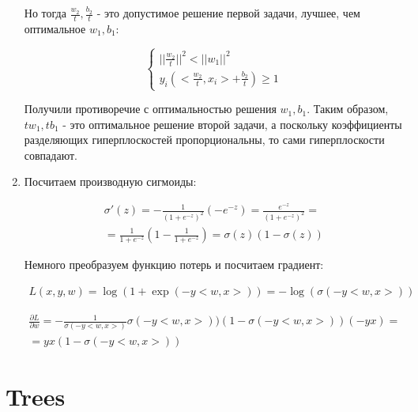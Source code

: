 \documentclass{article}
\begin{document}
\begin{enumerate}
    Но тогда $ \frac{w_2}{t}, \frac{b_2}{t} $ - это допустимое решение первой задачи, лучшее, чем оптимальное $ w_1, b_1 $:

    \small
    \begin{equation*}
        \begin{cases}
            {|| \frac{w_2}{t} ||}^2 < {|| w_1 ||}^2 \\
            y_i (<\frac{w_2}{t}, x_i> + \frac{b_2}{t}) \ge 1
        \end{cases}
    \end{equation*}
    \normalsize

    Получили противоречие с оптимальностью решения $ w_1, b_1 $. Таким образом, $ t w_1, t b_1 $ - это оптимальное решение второй задачи,
    а поскольку коэффициенты разделяющих гиперплоскостей пропорциональны, то сами гиперплоскости совпадают.

    \item Посчитаем производную сигмоиды:

    \small
    \begin{gather*}
        \sigma'(z) = -\frac{1}{{(1 + e^{-z})}^2} \left( -e^{-z} \right) = \frac{e^{-z}}{{(1 + e^{-z})}^2} = \\
        = \frac{1}{1 + e^{-z}} \left( 1 - \frac{1}{1 + e^{-z}} \right) = \sigma(z) (1 - \sigma(z))
    \end{gather*}
    \normalsize

    Немного преобразуем функцию потерь и посчитаем градиент:

    \small
    \begin{gather*}
        L(x, y, w) = \log{\left(1 + \exp{(-y <w, x>)}\right)} = -\log{\left(\sigma(-y <w, x>)\right)}
    \end{gather*}

    \begin{gather*}
        \frac{\partial L}{\partial w} =
        -\frac{1}{\sigma(-y <w, x>)} \sigma(-y <w, x>)) \left( 1 - \sigma(-y <w, x>) \right) (-y x) = \\
        = y x \left( 1 - \sigma(-y <w, x>) \right)
    \end{gather*}
    \normalsize

\end{enumerate}

\section{Trees}
\end{document}

